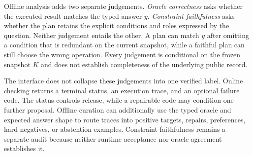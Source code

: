 Offline analysis adds two separate judgements.  \emph{Oracle correctness} asks whether the executed
result matches the typed answer $y$.  \emph{Constraint faithfulness} asks whether the plan retains
the explicit conditions and roles expressed by the question.  Neither judgement entails the other.
A plan can match $y$ after omitting a condition that is redundant on the current snapshot, while a
faithful plan can still choose the wrong operation.  Every judgement is conditional on the frozen
snapshot $K$ and does not establish completeness of the underlying public record.

The interface does not collapse these judgements into one verified label.  Online checking returns
a terminal status, an execution trace, and an optional failure code.  The status controls release,
while a repairable code may condition one further proposal.  Offline curation can additionally use
the typed oracle and expected answer shape to route traces into positive targets, repairs,
preferences, hard negatives, or abstention examples.  Constraint faithfulness remains a separate
audit because neither runtime acceptance nor oracle agreement establishes it.
